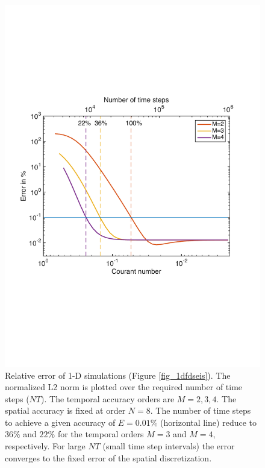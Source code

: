 \documentclass[11pt,onecolumn,oneside]{article}
\begin{document}
\begin{figure}[h]
\begin{center}
\includegraphics[scale=0.7]{figures/error_1D_courant}
\caption{Relative error of 1-D simulations (Figure \ref{fig_1dfdseis}). 
The normalized L2 norm is plotted over the required number of time steps ($NT$). The temporal accuracy orders are $M=2,3,4$. The spatial accuracy is fixed at order $N=8$. 
The number of time steps to achieve a given accuracy of $E=0.01\%$ (horizontal line) reduce to $36\%$ and $22\%$ for the temporal orders $M=3$ and $M=4$, respectively. 
For large $NT$ (small time step intervals) the error converges to the fixed error of the spatial discretization. }
\label{fig_L2}
\end{center}
\end{figure}
\newpage
\end{document}
